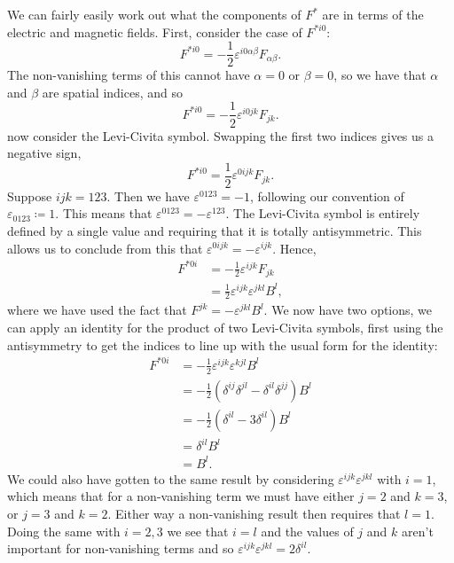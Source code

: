 We can fairly easily work out what the components of \(F^*\) are in terms of the electric and magnetic fields.
First, consider the case of \(F^{*i0}\):
\begin{equation}
    F^{*i0} = -\frac{1}{2}\varepsilon^{i0\alpha\beta}F_{\alpha\beta}.
\end{equation}
The non-vanishing terms of this cannot have \(\alpha = 0\) or \(\beta = 0\), so we have that \(\alpha\) and \(\beta\) are spatial indices, and so
\begin{equation}
    F^{*i0} = -\frac{1}{2}\varepsilon^{i0jk}F_{jk}.
\end{equation}
now consider the Levi-Civita symbol.
Swapping the first two indices gives us a negative sign,
\begin{equation}
    F^{*i0} = \frac{1}{2}\varepsilon^{0ijk}F_{jk}.
\end{equation}
Suppose \(ijk = 123\).
Then we have \(\varepsilon^{0123} = -1\), following our convention of \(\varepsilon_{0123} \coloneqq 1\).
This means that \(\varepsilon^{0123} = -\varepsilon^{123}\).
The Levi-Civita symbol is entirely defined by a single value and requiring that it is totally antisymmetric.
This allows us to conclude from this that \(\varepsilon^{0ijk} = -\varepsilon^{ijk}\).
Hence,
\begin{align}
    F^{*0i} &= -\frac{1}{2}\varepsilon^{ijk}F_{jk}\\
    &= \frac{1}{2}\varepsilon^{ijk}\varepsilon^{jkl}B^l,
\end{align}
where we have used the fact that \(F^{jk} = -\varepsilon^{jkl}B^l\).
We now have two options, we can apply an identity for the product of two Levi-Civita symbols, first using the antisymmetry to get the indices to line up with the usual form for the identity:
\begin{align}
    F^{*0i} &= -\frac{1}{2}\varepsilon^{ijk}\varepsilon^{kjl}B^l\\
    &= -\frac{1}{2}(\delta^{ij}\delta^{jl} - \delta^{il}\delta^{jj})B^l\\
    &= -\frac{1}{2}(\delta^{il} - 3\delta^{il})B^l\\
    &= \delta^{il}B^l\\
    &= B^l.
\end{align}
We could also have gotten to the same result by considering \(\varepsilon^{ijk}\varepsilon^{jkl}\) with \(i = 1\), which means that for a non-vanishing term we must have either \(j = 2\) and \(k = 3\), or \(j = 3\) and \(k = 2\).
Either way a non-vanishing result then requires that \(l = 1\).
Doing the same with \(i = 2, 3\) we see that \(i = l\) and the values of \(j\) and \(k\) aren't important for non-vanishing terms and so \(\varepsilon^{ijk}\varepsilon^{jkl} = 2\delta^{il}\).

